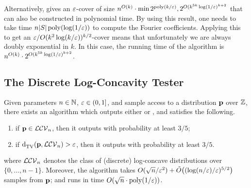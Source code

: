  Alternatively, \cite{DDKT:16} gives an $\eps$-cover of size $n^{O(k)} \cdot \min{2^{\poly(k/\eps)}, 2^{O(k^{5k} \log(1/\eps)^{k+2}}}$ that can also be constructed in polynomial time. By using this result, one needs to take time $n|S|\poly(\log(1/\eps))$ to compute the Fourier coefficients. Applying this to get an $\eps/O(k^2\log(k/\eps))^{k/2}$-cover means that unfortunately we are always doubly exponential in $k$. In this case, the running time of the algorithm is $n^{O(k)} \cdot  2^{O(k^{5k} \log(1/\eps)^{k+2}}$.
 
 

 
\subsection{The Discrete Log-Concavity Tester}\label{sec:log:concaves}
\begin{theorem}
Given parameters $n\in\N$, $\eps\in(0,1]$, and sample access to a distribution $\p$ over $\Z$, there exists an algorithm which outputs either \accept or \reject, and satisfies the following.
    \begin{enumerate}
        \item if $\p \in \classlogconcave[n]$, then it outputs \accept with probability at least $3/5$;
        \item if $\totalvardist{\p}{\classlogconcave[n]} > \eps$, then it outputs \reject with probability at least $3/5$.
    \end{enumerate}
where $\classlogconcave[n]$ denotes the class of (discrete) log-concave distributions over $\{0,\dots,n-1\}$. Moreover, the algorithm takes $O(\sqrt{n}/\eps^2) + \tildeO{(\log(n/\eps)/\eps)^{5/2}}$ samples from $\p$; and runs in time $O(\sqrt{n} \cdot \poly(1/\eps))$.
\end{theorem}


